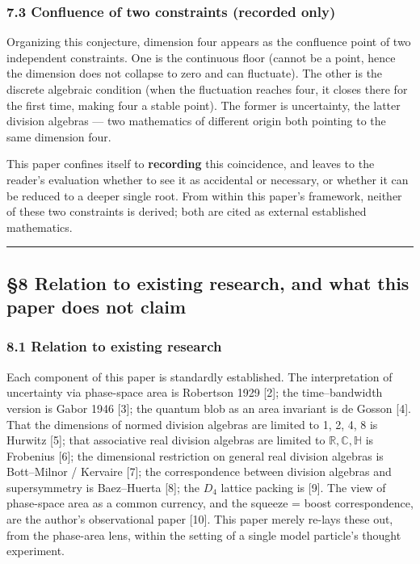 \documentclass[
]{article}
\begin{document}
\subsubsection{7.3 Confluence of two constraints (recorded
only)}\label{confluence-of-two-constraints-recorded-only}

Organizing this conjecture, dimension four appears as the confluence
point of two independent constraints. One is the continuous floor
(cannot be a point, hence the dimension does not collapse to zero and
can fluctuate). The other is the discrete algebraic condition (when the
fluctuation reaches four, it closes there for the first time, making
four a stable point). The former is uncertainty, the latter division
algebras --- two mathematics of different origin both pointing to the
same dimension four.

This paper confines itself to \textbf{recording} this coincidence, and
leaves to the reader's evaluation whether to see it as accidental or
necessary, or whether it can be reduced to a deeper single root. From
within this paper's framework, neither of these two constraints is
derived; both are cited as external established mathematics.

\begin{center}\rule{0.5\linewidth}{0.5pt}\end{center}

\subsection{§8 Relation to existing research, and what this paper does
not
claim}\label{relation-to-existing-research-and-what-this-paper-does-not-claim}

\subsubsection{8.1 Relation to existing
research}\label{relation-to-existing-research}

Each component of this paper is standardly established. The
interpretation of uncertainty via phase-space area is Robertson 1929
{[}2{]}; the time--bandwidth version is Gabor 1946 {[}3{]}; the quantum
blob as an area invariant is de Gosson {[}4{]}. That the dimensions of
normed division algebras are limited to 1, 2, 4, 8 is Hurwitz {[}5{]};
that associative real division algebras are limited to
\(\mathbb{R},\mathbb{C},\mathbb{H}\) is Frobenius {[}6{]}; the
dimensional restriction on general real division algebras is
Bott--Milnor / Kervaire {[}7{]}; the correspondence between division
algebras and supersymmetry is Baez--Huerta {[}8{]}; the \(D_4\) lattice
packing is {[}9{]}. The view of phase-space area as a common currency,
and the squeeze = boost correspondence, are the author's observational
paper {[}10{]}. This paper merely re-lays these out, from the phase-area
lens, within the setting of a single model particle's thought
experiment.
\end{document}
